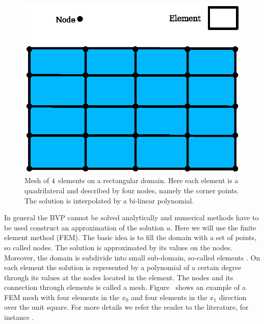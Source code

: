 \begin{figure}
\centerline{\includegraphics[width=\figwidth]{FirstStepMesh}}
\caption{Mesh of $4 \time 4$ elements on a rectangular domain.  Here
each element is a quadrilateral and described by four nodes, namely
the corner points. The solution is interpolated by a bi-linear
polynomial.}
\label{fig:FirstSteps.2}
\end{figure}

In general the BVP cannot be solved analytically and numerical
methods have to be used construct an approximation of the solution
$u$. Here we will use the finite element method (FEM). The basic idea is to fill the domain with a
set of points, so called nodes. The solution is approximated by its
values on the nodes. Moreover, the domain is subdivide into small
sub-domain, so-called elements . On each element the solution is
represented by a polynomial of a certain degree through its values at
the nodes located in the element. The nodes and its connection through
elements is called a mesh. Figure~ shows an
example of a FEM mesh with four elements in the $x_0$ and four elements
in the $x_1$ direction over the unit square.  
For more details we refer the reader to the literature, for instance
.

